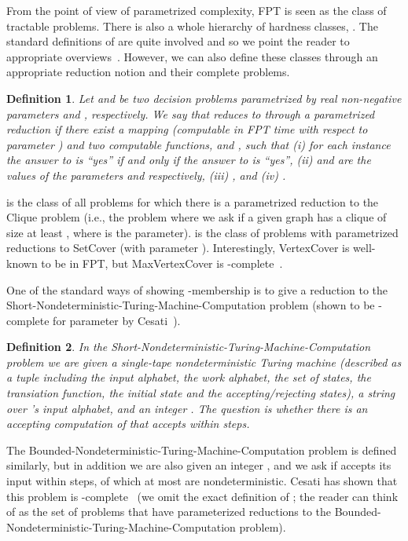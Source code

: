 \documentclass[11pt]{article}
\newtheorem{definition}{Definition}
\begin{document}
From the point of view of parametrized complexity, FPT is seen as the
class of tractable problems. There is also a whole hierarchy of
hardness classes, . The standard definitions of  are quite involved and so we point the reader to
appropriate
overviews~\cite{dow-fel:b:parameterized,nie:b:invitation-fpt,flu-gro:b:parameterized-complexity}.
However, we can also define these classes through an appropriate
reduction notion and their complete problems.

\begin{definition}
  Let  and  be two decision problems
  parametrized by real non-negative parameters  and
  , respectively. We say that  reduces to
   through a parametrized reduction if there exist a
  mapping  (computable
  in FPT time with respect to parameter ) and two
  computable functions, 
  and , such that (i) for each
  instance  the answer to  is ``yes''
  if and only if the answer to  is ``yes'', (ii) 
  and  are the values of the parameters  and
   respectively, (iii) ,
  and (iv) .
\end{definition}

 is the class of all problems for which there is a parametrized
reduction to the Clique problem (i.e., the problem where we ask if a
given graph  has a clique of size at least , where 
is the parameter).  is the class of problems with parametrized
reductions to SetCover (with parameter ).  Interestingly,
VertexCover is well-known to be in FPT, but MaxVertexCover is
-complete~\cite{guo-nie-wer:j:vertex-cover-variants}.

One of the standard ways of showing -membership is to give a
reduction to the
Short-Non\-de\-ter\-ministic-Turing-Machi\-ne-Com\-putation problem
(shown to be -complete for parameter  by
Cesati~\cite{ces:j:turing-way-parameterized-complexity}).

\begin{definition}
  In the Short-Non\-de\-ter\-ministic-Turing-Machi\-ne-Com\-putation
  problem we are given a single-tape nondeterministic Turing machine
   (described as a tuple including the input alphabet, the work
  alphabet, the set of states, the transiation function, the initial
  state and the accepting/rejecting states), a string  over 's
  input alphabet, and an integer . The question is whether there is
  an accepting computation of  that accepts  within  steps.
\end{definition}


The Bounded-Non\-de\-ter\-ministic-Turing-Machi\-ne-Com\-putation
problem is defined similarly, but in addition we are also given an
integer , and we ask if  accepts its input within  steps, of
which at most  are nondeterministic. Cesati has shown that this
problem is
-complete~\cite{ces:j:turing-way-parameterized-complexity}
(we omit the exact definition of ; the reader can think of
 as the set of problems that have parameterized reductions
to the Bounded-Non\-de\-ter\-ministic-Turing-Machi\-ne-Com\-putation
problem).
\end{document}
